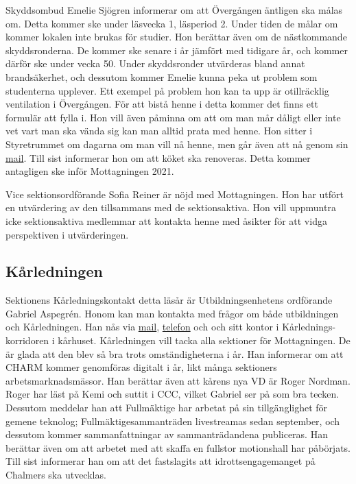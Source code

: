 \documentclass[hidelinks]{../sektionsmote} %
\begin{document}
Skyddsombud Emelie Sjögren informerar om att Övergången äntligen ska målas om.
Detta kommer ske under läsvecka 1, läsperiod 2.
Under tiden de målar om kommer lokalen inte brukas för studier.
Hon berättar även om de nästkommande skyddsronderna.
De kommer ske senare i år jämfört med tidigare år, och kommer därför ske under vecka 50. Under skyddsronder utvärderas bland annat brandsäkerhet, och dessutom kommer Emelie kunna peka ut problem som studenterna upplever.
Ett exempel på problem hon kan ta upp är otillräcklig ventilation i Övergången.
För att bistå henne i detta kommer det finns ett formulär att fylla i.
Hon vill även påminna om att om man mår dåligt eller inte vet vart man ska vända sig kan man alltid prata med henne.
Hon sitter i Styretrummet om dagarna om man vill nå henne, men går även att nå genom sin \href{mailto:styret.samo@ftek.se}{mail}.
Till sist informerar hon om att köket ska renoveras.
Detta kommer antagligen ske inför Mottagningen 2021.

Vice sektionsordförande Sofia Reiner är nöjd med Mottagningen.
Hon har utfört en utvärdering av den tillsammans med de sektionsaktiva.
Hon vill uppmuntra icke sektionsaktiva medlemmar att kontakta henne med åsikter för att vidga perspektiven i utvärderingen.

\subsection{Kårledningen}
Sektionens Kårledningskontakt detta läsår är Utbildningsenhetens ordförande Gabriel Aspegrén.
Honom kan man kontakta med frågor om både utbildningen och Kårledningen.
Han nås via \href{mailto:uo@chalmersstudentkar.se}{mail}, \href{tel:+46317723912}{telefon} och och sitt kontor i Kårlednings-korridoren i kårhuset.
Kårledningen vill tacka alla sektioner för Mottagningen.
De är glada att den blev så bra trots omständigheterna i år.
Han informerar om att CHARM kommer genomföras digitalt i år, likt många sektioners arbetsmarknadsmässor.
Han berättar även att kårens nya VD är Roger Nordman.
Roger har läst på Kemi och suttit i CCC, vilket Gabriel ser på som bra tecken.
Dessutom meddelar han att Fullmäktige har arbetat på sin tillgänglighet för gemene teknolog; Fullmäktigesammanträden livestreamas sedan september, och dessutom kommer sammanfattningar av sammanträdandena publiceras.
Han berättar även om att arbetet med att skaffa en fullstor motionshall har påbörjats.
Till sist informerar han om att det fastslagits att idrottsengagemanget på Chalmers ska utvecklas.
\end{document}
